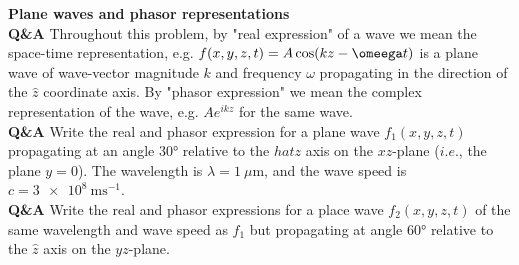 \documentclass[main.tex]{subfiles}
\begin{document}
\textbf{Plane waves and phasor representations}\\
\textbf{Q\&A} Throughout this problem, by "real expression" of a wave we mean the space-time representation, e.g. $f(x,y,z,t) = A\cos(kz-\omeega t)$ is a plane wave of wave-vector magnitude $k$ and frequency $\omega$ propagating in the direction of the $\hat{z}$ coordinate axis. By "phasor expression" we mean the complex representation of the wave, e.g. $Ae^{ikz}$ for the same wave.\\

\textbf{Q\&A} Write the real and phasor expression for a plane wave $f_1(x,y,z,t)$ propagating at an angle $\ang{30}$ relative to the $hat{z}$ axis on the $xz$-plane ($i.e.$, the plane $y=0$). The wavelength is $\lambda = \SI{1}{\mu \meter}$, and the wave speed is $c = \SI{3e8}{\metre \second^{-1}}$.\\

\textbf{Q\&A} Write the real and phasor expressions for a place wave $f_2(x,y,z,t)$ of the same wavelength and wave speed as $f_1$ but propagating at angle $\ang{60}$ relative to the $\hat{z}$ axis on the $yz$-plane.
\end{document}
